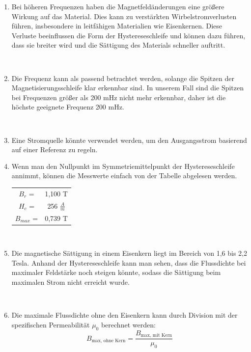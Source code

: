 \documentclass[a4paper,twoside,12pt,DIV=13,BCOR=5mm,numbers=noenddot,cleardoublepage=empty]{scrbook}
\begin{document}
\begin{enumerate}
            \\

            \item Bei höheren Frequenzen haben die Magnetfeldänderungen eine größere Wirkung auf das Material. Dies kann zu verstärkten Wirbelstromverlusten führen, insbesondere in leitfähigen Materialien wie Eisenkernen. Diese Verluste beeinflussen die Form der Hystereseschleife und können dazu führen, dass sie breiter wird und die Sättigung des Materials schneller auftritt.

            \\

            \item Die Frequenz kann als passend betrachtet werden, solange die Spitzen der Magnetisierungsschleife klar erkennbar sind. In unserem Fall sind die Spitzen bei Frequenzen größer als 200 mHz nicht mehr erkennbar, daher ist die höchste geeignete Frequenz 200 mHz.

            \\

            \item Eine Stromquelle könnte verwendet werden, um den Ausgangsstrom basierend auf einer Referenz zu regeln.             
            \\

            \item Wenn man den Nullpunkt im Symmetriemittelpunkt der Hystereseschleife annimmt, können die Messwerte einfach von der Tabelle abgelesen werden. \\
            \begin{tabular}{cc}
                $B_r$ =& 1,100 T  \\
                $H_c$ =& 256 $\frac{A}{m}$ \\
                $B_{max}$ =& 0,739 T
            \end{tabular}
            
            \\
            
            \item Die magnetische Sättigung in einem Eisenkern liegt im Bereich von 1,6 bis 2,2 Tesla. Anhand der Hystereseschleife kann man sehen, dass die Flussdichte bei maximaler Feldstärke noch steigen könnte, sodass die Sättigung beim maximalen Strom nicht erreicht wurde.

            \\
            
            \item Die maximale Flussdichte ohne den Eisenkern kann durch Division mit der spezifischen Permeabilität $\mu_0$ berechnet werden:
                \begin{equation}
                B_{\text{max, ohne Kern}} = \frac{B_{\text{max, mit Kern}}}{\mu_0}
                \end{equation}
    

\end{enumerate}
\end{document}
